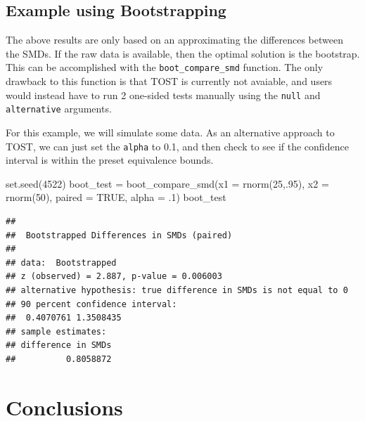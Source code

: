 \documentclass[]{interact}
\theoremstyle{plain}%
\theoremstyle{definition}
\theoremstyle{remark}
\newenvironment{Shaded}{\begin{snugshade}}{\end{snugshade}}
\newcommand{\AttributeTok}[1]{\textcolor[rgb]{0.77,0.63,0.00}{#1}}
\newcommand{\ConstantTok}[1]{\textcolor[rgb]{0.00,0.00,0.00}{#1}}
\newcommand{\DecValTok}[1]{\textcolor[rgb]{0.00,0.00,0.81}{#1}}
\newcommand{\FunctionTok}[1]{\textcolor[rgb]{0.00,0.00,0.00}{#1}}
\newcommand{\NormalTok}[1]{#1}
\newcommand{\OtherTok}[1]{\textcolor[rgb]{0.56,0.35,0.01}{#1}}
\begin{document}
\hypertarget{example-using-bootstrapping}{%
\subsection{Example using
Bootstrapping}\label{example-using-bootstrapping}}

The above results are only based on an approximating the differences
between the SMDs. If the raw data is available, then the optimal
solution is the bootstrap. This can be accomplished with the
\texttt{boot\_compare\_smd} function. The only drawback to this function
is that TOST is currently not avaiable, and users would instead have to
run 2 one-sided tests manually using the \texttt{null} and
\texttt{alternative} arguments.

For this example, we will simulate some data. As an alternative approach
to TOST, we can just set the \texttt{alpha} to 0.1, and then check to
see if the confidence interval is within the preset equivalence bounds.

\begin{Shaded}
\begin{Highlighting}[]
\FunctionTok{set.seed}\NormalTok{(}\DecValTok{4522}\NormalTok{)}
\NormalTok{boot\_test }\OtherTok{=} \FunctionTok{boot\_compare\_smd}\NormalTok{(}\AttributeTok{x1 =} \FunctionTok{rnorm}\NormalTok{(}\DecValTok{25}\NormalTok{,.}\DecValTok{95}\NormalTok{), }\AttributeTok{x2 =} \FunctionTok{rnorm}\NormalTok{(}\DecValTok{50}\NormalTok{), }
                             \AttributeTok{paired =} \ConstantTok{TRUE}\NormalTok{, }\AttributeTok{alpha =}\NormalTok{ .}\DecValTok{1}\NormalTok{)}
\NormalTok{boot\_test}
\end{Highlighting}
\end{Shaded}

\begin{verbatim}
## 
##  Bootstrapped Differences in SMDs (paired)
## 
## data:  Bootstrapped
## z (observed) = 2.887, p-value = 0.006003
## alternative hypothesis: true difference in SMDs is not equal to 0
## 90 percent confidence interval:
##  0.4070761 1.3508435
## sample estimates:
## difference in SMDs 
##          0.8058872
\end{verbatim}

\newpage

\hypertarget{conclusions}{%
\section{Conclusions}\label{conclusions}}
\end{document}
